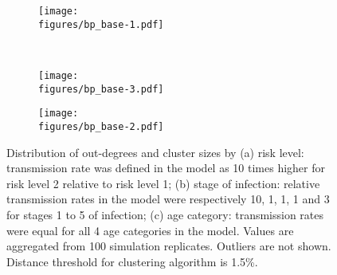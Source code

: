 \documentclass[preview]{standalone}
\newcommand{\figures}{./figure}
\begin{document}
\begin{figure}
    \centering
    \begin{subfigure}[b]{0.45\textwidth}
        \caption{}
        \texttt{[image: \\figures/bp\_base-1.pdf]}
        \label{fig1a}
    \end{subfigure}
    ~ 
    \begin{subfigure}[b]{0.45\textwidth}
        \caption{}
        \texttt{[image: \\figures/bp\_base-3.pdf]}        
        \label{fig1b}
    \end{subfigure}
    
    \begin{subfigure}[b]{0.45\textwidth}
        \caption{}
        \texttt{[image: \\figures/bp\_base-2.pdf]}        
        \label{fig1c}
    \end{subfigure}
   \caption[Distribution of out-degrees and cluster sizes by covariates]{Distribution of out-degrees and cluster sizes by (a) risk level: transmission rate was defined in the model as 10 times higher for risk level 2 relative to risk level 1; (b) stage of infection: relative transmission rates in the model were respectively 10, 1, 1, 1 and 3 for stages 1 to 5 of infection; (c) age category: transmission rates were equal for all 4 age categories in the model. Values are aggregated from 100 simulation replicates. Outliers are not shown. Distance threshold for clustering algorithm is 1.5\%.}
   \label{fig1}
\end{figure}

\end{document}

